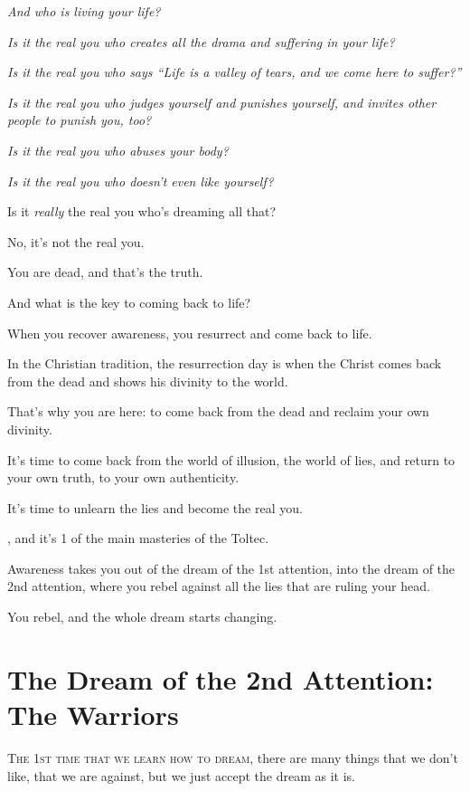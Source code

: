 \documentclass{article}
\numberwithin{equation}{section}
\begin{document}
\textit{And who is living your life?}

%
\textit{Is it the real you who creates all the drama and suffering in your life?}

\textit{Is it the real you who says ``Life is a valley of tears, and we come here to suffer?''}

\textit{Is it the real you who judges yourself and punishes yourself, and invites other people to punish you, too?}

\textit{Is it the real you who abuses your body?}

\textit{Is it the real you who doesn't even like yourself?}

Is it \textit{really} the real you who's dreaming all that?

%
No, it's not the real you.

You are dead, and that's the truth.

And what is the key to coming back to life?


When you recover awareness, you resurrect and come back to life.

In the Christian tradition, the resurrection day is when the Christ comes back from the dead and shows his divinity to the world.

That's why you are here: to come back from the dead and reclaim your own divinity.

It's time to come back from the world of illusion, the world of lies, and return to your own truth, to your own authenticity.

It's time to unlearn the lies and become the real you.


%
, and it's 1 of the main masteries of the Toltec.

Awareness takes you out of the dream of the 1st attention, into the dream of the 2nd attention, where you rebel against all the lies that are ruling your head.

You rebel, and the whole dream starts changing.

\section{The Dream of the 2nd Attention: The Warriors}
\textsc{The 1st time that we learn how to dream}, there are many things that we don't like, that we are against, but we just accept the dream as it is.
\end{document}
